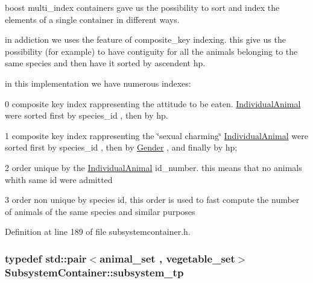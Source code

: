 boost multi\_\-index containers gave us the possibility to sort and index the elements of a single container in different ways.

in addiction we uses the feature of composite\_\-key indexing. this give us the possibility (for example) to have contiguity for all the animals belonging to the same species and then have it sorted by ascendent hp.

in this implementation we have numerous indexes:


\begin{DoxyItemize}
\item 0 composite key index rappresenting the attitude to be eaten. \hyperlink{classIndividualAnimal}{IndividualAnimal} were sorted first by species\_\-id , then by hp.
\end{DoxyItemize}


\begin{DoxyItemize}
\item 1 composite key index rappresenting the \char`\"{}sexual charming\char`\"{} \hyperlink{classIndividualAnimal}{IndividualAnimal} were sorted first by species\_\-id , then by \hyperlink{classGender}{Gender} , and finally by hp;
\end{DoxyItemize}


\begin{DoxyItemize}
\item 2 order unique by the \hyperlink{classIndividualAnimal}{IndividualAnimal} id\_\-number. this means that no animals whith same id were admitted
\end{DoxyItemize}


\begin{DoxyItemize}
\item 3 order non unique by species id, this order is used to fast compute the number of animals of the same species and similar purposes 
\end{DoxyItemize}

Definition at line 189 of file subsystemcontainer.h.

\hypertarget{classSubsystemContainer_a2c517c44fccdecc58869c24ab6d3f667}{
\subsubsection[{subsystem\_\-tp}]{\setlength{\rightskip}{0pt plus 5cm}typedef std::pair$<${\bf animal\_\-set} , {\bf vegetable\_\-set}$>$ {\bf SubsystemContainer::subsystem\_\-tp}}}
\label{classSubsystemContainer_a2c517c44fccdecc58869c24ab6d3f667}


